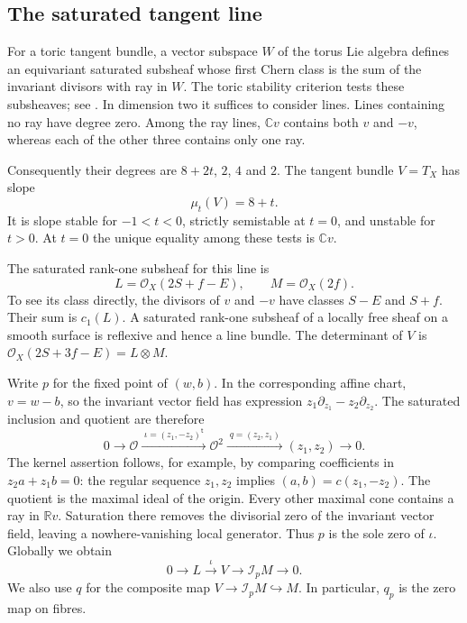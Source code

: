 \documentclass[11pt]{amsart}
\theoremstyle{definition}
\theoremstyle{remark}
\newcommand{\CC}{\mathbb C}
\newcommand{\RR}{\mathbb R}
\newcommand{\cO}{\mathcal O}
\newcommand{\cI}{\mathcal I}
\begin{document}
\subsection{The saturated tangent line}
For a toric tangent bundle, a vector subspace $W$ of the torus Lie algebra
defines an equivariant saturated subsheaf whose first Chern class is the
sum of the invariant divisors with ray in $W$. The toric stability
criterion tests these subsheaves; see \cite{klyachko1990,hering2022}.
In dimension two it suffices to consider lines. Lines containing no ray
have degree zero. Among the ray lines, $\CC v$ contains both $v$ and
$-v$, whereas each of the other three contains only one ray.

Consequently their degrees are $8+2t$, $2$, $4$ and $2$. The tangent
bundle $V=T_X$ has slope
\begin{equation}\label{eq:slopes}
 \mu_t(V)=8+t.
\end{equation}
It is slope stable for $-1<t<0$, strictly semistable at $t=0$, and
unstable for $t>0$. At $t=0$ the unique equality among these tests is
$\CC v$.

The saturated rank-one subsheaf for this line is
\begin{equation}\label{eq:line-bundles}
 L=\cO_X(2S+f-E),\qquad M=\cO_X(2f).
\end{equation}
To see its class directly, the divisors of $v$ and $-v$ have classes
$S-E$ and $S+f$. Their sum is $c_1(L)$. A saturated rank-one subsheaf
of a locally free sheaf on a smooth surface is reflexive and hence a
line bundle. The determinant of $V$ is $\cO_X(2S+3f-E)=L\otimes M$.

Write $p$ for the fixed point of $(w,b)$. In the corresponding affine
chart, $v=w-b$, so the invariant vector field has expression
$z_1\partial_{z_1}-z_2\partial_{z_2}$. The saturated inclusion and
quotient are therefore
\begin{equation}\label{eq:local-resolution}
 0\longrightarrow\cO\xrightarrow{\;\iota=(z_1,-z_2)^{\mathsf t}\;}
 \cO^2\xrightarrow{\;q=(z_2,z_1)\;}(z_1,z_2)\longrightarrow0.
\end{equation}
The kernel assertion follows, for example, by comparing coefficients
in $z_2 a+z_1 b=0$: the regular sequence $z_1,z_2$ implies
$(a,b)=c(z_1,-z_2)$. The quotient is the maximal ideal of the origin.
Every other maximal cone contains a ray in $\RR v$. Saturation there
removes the divisorial zero of the invariant vector field, leaving a
nowhere-vanishing local generator. Thus $p$ is the sole zero of $\iota$.
Globally we obtain
\begin{equation}\label{eq:extension}
 0\longrightarrow L\xrightarrow{\iota}V
 \longrightarrow\cI_p M\longrightarrow0.
\end{equation}
We also use $q$ for the composite map $V\to\cI_pM\hookrightarrow M$.
In particular, $q_p$ is the zero map on fibres.
\end{document}
